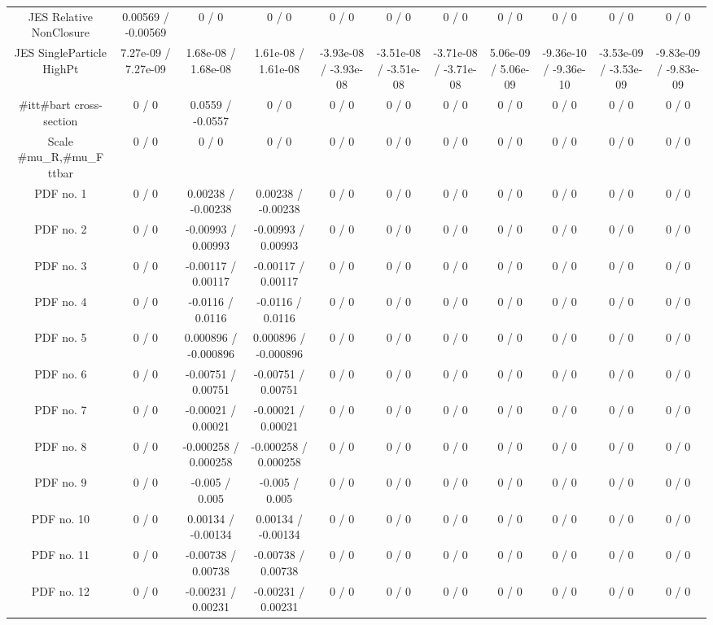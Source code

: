 \begin{table}[htbp]
\begin{center}
\begin{tabular}{|c|c|c|c|c|c|c|c|c|c|c|}
  JES Relative NonClosure & 0.00569 / -0.00569 & 0 / 0 & 0 / 0 & 0 / 0 & 0 / 0 & 0 / 0 & 0 / 0 & 0 / 0 & 0 / 0 & 0 / 0 \\ 
  JES SingleParticle HighPt & 7.27e-09 / 7.27e-09 & 1.68e-08 / 1.68e-08 & 1.61e-08 / 1.61e-08 & -3.93e-08 / -3.93e-08 & -3.51e-08 / -3.51e-08 & -3.71e-08 / -3.71e-08 & 5.06e-09 / 5.06e-09 & -9.36e-10 / -9.36e-10 & -3.53e-09 / -3.53e-09 & -9.83e-09 / -9.83e-09 \\ 
  #it{t#bar{t}} cross-section & 0 / 0 & 0.0559 / -0.0557 & 0 / 0 & 0 / 0 & 0 / 0 & 0 / 0 & 0 / 0 & 0 / 0 & 0 / 0 & 0 / 0 \\ 
  Scale #mu_{R},#mu_{F} ttbar & 0 / 0 & 0 / 0 & 0 / 0 & 0 / 0 & 0 / 0 & 0 / 0 & 0 / 0 & 0 / 0 & 0 / 0 & 0 / 0 \\ 
  PDF no. 1 & 0 / 0 & 0.00238 / -0.00238 & 0.00238 / -0.00238 & 0 / 0 & 0 / 0 & 0 / 0 & 0 / 0 & 0 / 0 & 0 / 0 & 0 / 0 \\ 
  PDF no. 2 & 0 / 0 & -0.00993 / 0.00993 & -0.00993 / 0.00993 & 0 / 0 & 0 / 0 & 0 / 0 & 0 / 0 & 0 / 0 & 0 / 0 & 0 / 0 \\ 
  PDF no. 3 & 0 / 0 & -0.00117 / 0.00117 & -0.00117 / 0.00117 & 0 / 0 & 0 / 0 & 0 / 0 & 0 / 0 & 0 / 0 & 0 / 0 & 0 / 0 \\ 
  PDF no. 4 & 0 / 0 & -0.0116 / 0.0116 & -0.0116 / 0.0116 & 0 / 0 & 0 / 0 & 0 / 0 & 0 / 0 & 0 / 0 & 0 / 0 & 0 / 0 \\ 
  PDF no. 5 & 0 / 0 & 0.000896 / -0.000896 & 0.000896 / -0.000896 & 0 / 0 & 0 / 0 & 0 / 0 & 0 / 0 & 0 / 0 & 0 / 0 & 0 / 0 \\ 
  PDF no. 6 & 0 / 0 & -0.00751 / 0.00751 & -0.00751 / 0.00751 & 0 / 0 & 0 / 0 & 0 / 0 & 0 / 0 & 0 / 0 & 0 / 0 & 0 / 0 \\ 
  PDF no. 7 & 0 / 0 & -0.00021 / 0.00021 & -0.00021 / 0.00021 & 0 / 0 & 0 / 0 & 0 / 0 & 0 / 0 & 0 / 0 & 0 / 0 & 0 / 0 \\ 
  PDF no. 8 & 0 / 0 & -0.000258 / 0.000258 & -0.000258 / 0.000258 & 0 / 0 & 0 / 0 & 0 / 0 & 0 / 0 & 0 / 0 & 0 / 0 & 0 / 0 \\ 
  PDF no. 9 & 0 / 0 & -0.005 / 0.005 & -0.005 / 0.005 & 0 / 0 & 0 / 0 & 0 / 0 & 0 / 0 & 0 / 0 & 0 / 0 & 0 / 0 \\ 
  PDF no. 10 & 0 / 0 & 0.00134 / -0.00134 & 0.00134 / -0.00134 & 0 / 0 & 0 / 0 & 0 / 0 & 0 / 0 & 0 / 0 & 0 / 0 & 0 / 0 \\ 
  PDF no. 11 & 0 / 0 & -0.00738 / 0.00738 & -0.00738 / 0.00738 & 0 / 0 & 0 / 0 & 0 / 0 & 0 / 0 & 0 / 0 & 0 / 0 & 0 / 0 \\ 
  PDF no. 12 & 0 / 0 & -0.00231 / 0.00231 & -0.00231 / 0.00231 & 0 / 0 & 0 / 0 & 0 / 0 & 0 / 0 & 0 / 0 & 0 / 0 & 0 / 0 \\ 

\end{tabular}
\end{center}
\end{table}
